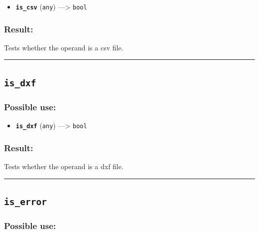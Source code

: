 \documentclass[]{book}
\providecommand{\tightlist}{%
  \setlength{\itemsep}{0pt}\setlength{\parskip}{0pt}}
\theoremstyle{definition}
\theoremstyle{definition}
\theoremstyle{definition}
\theoremstyle{remark}
\begin{document}
\begin{itemize}
\tightlist
\item
  \textbf{\texttt{is\_csv}} (\texttt{any}) ---\textgreater{}
  \texttt{bool}
\end{itemize}

\subsubsection{Result:}\label{result-275}

Tests whether the operand is a csv file.

\begin{center}\rule{0.5\linewidth}{\linethickness}\end{center}

\subsection{\texorpdfstring{\texttt{is\_dxf}}{is\_dxf}}\label{is_dxf}

\subsubsection{Possible use:}\label{possible-use-286}

\begin{itemize}
\tightlist
\item
  \textbf{\texttt{is\_dxf}} (\texttt{any}) ---\textgreater{}
  \texttt{bool}
\end{itemize}

\subsubsection{Result:}\label{result-276}

Tests whether the operand is a dxf file.

\begin{center}\rule{0.5\linewidth}{\linethickness}\end{center}

\subsection{\texorpdfstring{\texttt{is\_error}}{is\_error}}\label{is_error}

\subsubsection{Possible use:}\label{possible-use-287}
\end{document}
